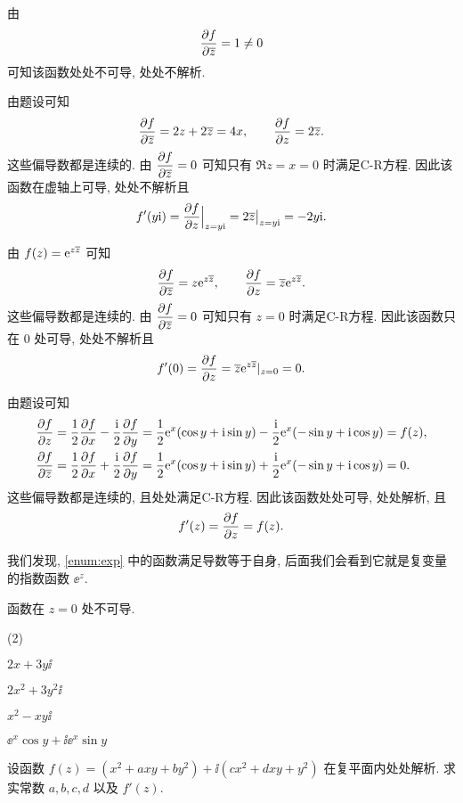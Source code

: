 \begin{solutionenum}[解法二]
  \item 由
  \[
    \pdv f{\overline z}=1\neq0
  \]
  可知该函数处处不可导, 处处不解析.
  \item 由题设可知
  \[
    \pdv f{\overline z}=2z+2\overline z=4x,\qquad
    \pdv fz=2\overline z.
  \]
  这些偏导数都是连续的.
  由 $\displaystyle\pdv f{\overline z}=0$ 可知只有 $\Re z=x=0$ 时满足C-R方程.
  因此该函数在虚轴上可导, 处处不解析且
  \[
      f'(y\mathrm{i})
    =\pdv fz\Big|_{z=y\mathrm{i}}
    =2\overline z\big|_{z=y\mathrm{i}}=-2y\mathrm{i}.
  \]
  \item 由 $f(z)=\mathrm{e}^{z\overline z}$ 可知
  \[
    \pdv f{\overline z}=z\mathrm{e}^{z\overline z},\qquad
    \pdv fz=\overline z\mathrm{e}^{z\overline z}.
  \]
  这些偏导数都是连续的.
  由 $\displaystyle\pdv f{\overline z}=0$ 可知只有 $z=0$ 时满足C-R方程.
  因此该函数只在 $0$ 处可导, 处处不解析且
  \[
    f'(0)=\pdv fz=\overline z\mathrm{e}^{z\overline z}|_{z=0}=0.
  \]
  \item 由题设可知
  \[
    \begin{aligned}
        \pdv fz&
      =\frac12\pdv fx-\frac {\mathrm{i}}2\pdv fy
      =\frac12\mathrm{e}^x(\cos y+\mathrm{i}\sin y)
        -\frac {\mathrm{i}}2\mathrm{e}^x(-\sin y+\mathrm{i}\cos y)
      =f(z),\\
        \pdv f{\overline z}&
      =\frac12\pdv fx+\frac {\mathrm{i}}2\pdv fy
      =\frac12\mathrm{e}^x(\cos y+\mathrm{i}\sin y)
        +\frac {\mathrm{i}}2\mathrm{e}^x(-\sin y+\mathrm{i}\cos y)
      =0.
    \end{aligned}
  \]
  这些偏导数都是连续的, 且处处满足C-R方程.
  因此该函数处处可导, 处处解析, 且
  \[
    f'(z)=\pdv fz=f(z).
  \]
\end{solutionenum}

我们发现, \ref{enum:exp} 中的函数满足导数等于自身, 后面我们会看到它就是复变量的指数函数 $\ee^z$.

\begin{exercise}
  函数\fillbrace{}在 $z=0$ 处不可导.
  \begin{examplechoice}(2)
    \item $2x+3y\ii$
    \item $2x^2+3y^2\ii$
    \item $x^2-xy\ii$
    \item $\ee^x\cos y+\ii \ee^x\sin y$
  \end{examplechoice}
\end{exercise}

\begin{example}
  设函数 $f(z)=(x^2+axy+by^2)+\ii(cx^2+dxy+y^2)$ 在复平面内处处解析.
  求实常数 $a,b,c,d$ 以及 $f'(z)$.
\end{example}

